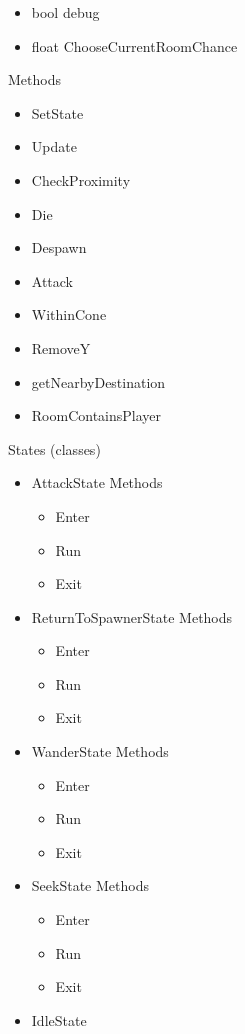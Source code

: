 \documentclass[11pt]{article}
\begin{document}
\begin{itemize}
\begin{itemize}
		\item bool debug
		\item float ChooseCurrentRoomChance
	\end{itemize}
	Methods
	\begin{itemize}
		\item SetState
		\item Update
		\item CheckProximity
		\item Die
		\item Despawn
		\item Attack
		\item WithinCone
		\item RemoveY
		\item getNearbyDestination
		\item RoomContainsPlayer
	\end{itemize}
\newpage
	States (classes)
	\begin{itemize}
		\item AttackState
		\newline Methods
		\begin{itemize}
			\item Enter
			\item Run
			\item Exit
		\end{itemize}
		\item ReturnToSpawnerState
		\newline Methods
		\begin{itemize}
			\item Enter
			\item Run
			\item Exit
		\end{itemize}
		\item WanderState
		\newline Methods
		\begin{itemize}
			\item Enter
			\item Run
			\item Exit
		\end{itemize}
		\item SeekState
		\newline Methods
		\begin{itemize}
			\item Enter
			\item Run
			\item Exit
		\end{itemize}
		\item IdleState

\end{itemize}
\end{itemize}
\end{document}
